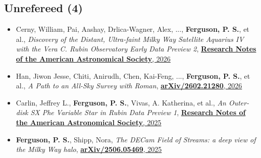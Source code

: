 \subsection{Unrefereed  (4)}
\begin{itemize}[itemsep=1pt]
    \item {Cerny}, William, {Pai}, Aashay, {Drlica-Wagner}, Alex, ..., \textbf{Ferguson, P. S.}, et al., \textit{{Discovery of the Distant, Ultra-faint Milky Way Satellite Aquarius IV with the Vera C. Rubin Observatory Early Data Preview 2}}, \href{https://ui.adsabs.harvard.edu/abs/2026RNAAS..10..239C}{\textbf{Research Notes of the American Astronomical Society}, 2026}
    \item {Han}, Jiwon Jesse, {Chiti}, Anirudh, {Chen}, Kai-Feng, ..., \textbf{Ferguson, P. S.}, et al., \textit{{A Path to an All-Sky Survey with Roman}}, \href{https://ui.adsabs.harvard.edu/abs/2026arXiv260221280H}{\textbf{arXiv/2602.21280}, 2026}
    \item {Carlin}, Jeffrey L., \textbf{Ferguson, P. S.}, {Vivas}, A. Katherina, et al., \textit{{An Outer-disk SX Phe Variable Star in Rubin Data Preview 1}}, \href{https://ui.adsabs.harvard.edu/abs/2025RNAAS...9..161C}{\textbf{Research Notes of the American Astronomical Society}, 2025}
    \item \textbf{Ferguson, P. S.}, {Shipp}, Nora, \textit{{The DECam Field of Streams: a deep view of the Milky Way halo}}, \href{https://ui.adsabs.harvard.edu/abs/2025arXiv250605469F}{\textbf{arXiv/2506.05469}, 2025}
\end{itemize}
